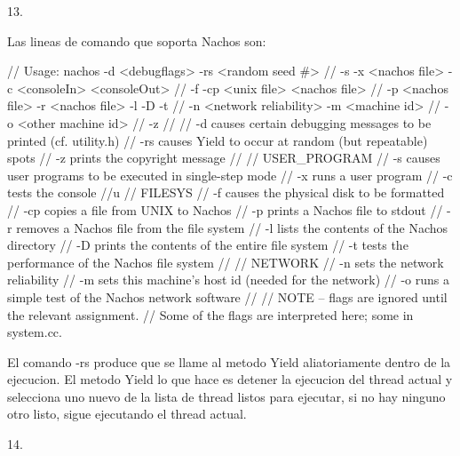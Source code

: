 \documentclass[a4paper, 11pt]{article}
\begin{document}
13.

Las lineas de comando que soporta Nachos son:

// Usage: nachos -d <debugflags> -rs <random seed #>
//		-s -x <nachos file> -c <consoleIn> <consoleOut>
//		-f -cp <unix file> <nachos file>
//		-p <nachos file> -r <nachos file> -l -D -t
//              -n <network reliability> -m <machine id>
//              -o <other machine id>
//              -z
//
//    -d causes certain debugging messages to be printed (cf. utility.h)
//    -rs causes Yield to occur at random (but repeatable) spots
//    -z prints the copyright message
//
//  USER_PROGRAM
//    -s causes user programs to be executed in single-step mode
//    -x runs a user program
//    -c tests the console
//u
//  FILESYS
//    -f causes the physical disk to be formatted
//    -cp copies a file from UNIX to Nachos
//    -p prints a Nachos file to stdout
//    -r removes a Nachos file from the file system
//    -l lists the contents of the Nachos directory
//    -D prints the contents of the entire file system 
//    -t tests the performance of the Nachos file system
//
//  NETWORK
//    -n sets the network reliability
//    -m sets this machine's host id (needed for the network)
//    -o runs a simple test of the Nachos network software
//
//  NOTE -- flags are ignored until the relevant assignment.
//  Some of the flags are interpreted here; some in system.cc.

El comando -rs produce que se llame al metodo Yield aliatoriamente dentro de la ejecucion. El metodo Yield lo que hace es detener la ejecucion del thread actual y selecciona uno nuevo de la lista de thread listos para ejecutar, si no hay ninguno otro listo, sigue ejecutando el thread actual.

14.
\end{document}
